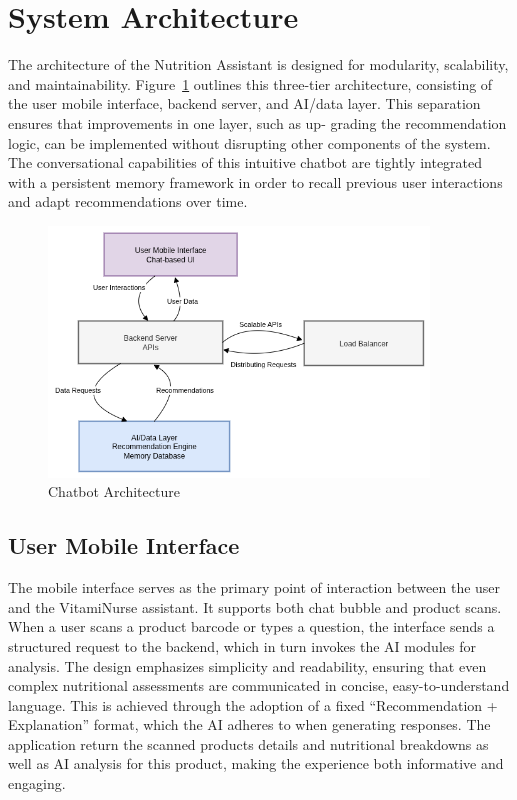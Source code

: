 \section{System Architecture}
The architecture of the Nutrition Assistant is designed for modularity, scalability, and maintainability. Figure~\ref{fig:chatbot Architect} outlines this three-tier architecture, consisting of the user mobile interface, backend server, and AI/data layer.
 This separation ensures that improvements in one layer, such as up-
grading the recommendation logic, can be implemented without disrupting other components of the system. The conversational capabilities of this intuitive chatbot are tightly integrated with a persistent memory framework in order to recall previous user interactions and adapt recommendations over time.  
 \begin{center}
    \begin{figure}[H]
    \includegraphics[width=0.9\textwidth]{images/Chatbot_arch.png}
    \caption{Chatbot Architecture} 
    \label{fig:chatbot Architect}
\end{figure}
\end{center}

\subsection{User Mobile Interface}
The mobile interface serves as the primary point of interaction between the user and the VitamiNurse assistant. It supports both chat bubble and product scans. When a user scans a product barcode or types a question, the interface sends a structured request to the backend, which in turn invokes the AI modules for analysis. The design emphasizes simplicity and readability, ensuring that even complex nutritional assessments are communicated in concise, easy-to-understand language. This is achieved through the adoption of a fixed “Recommendation + Explanation” format, which the AI adheres to when generating responses. The application return the scanned products details and nutritional breakdowns as well as AI analysis for this product, making the experience both informative and engaging.

